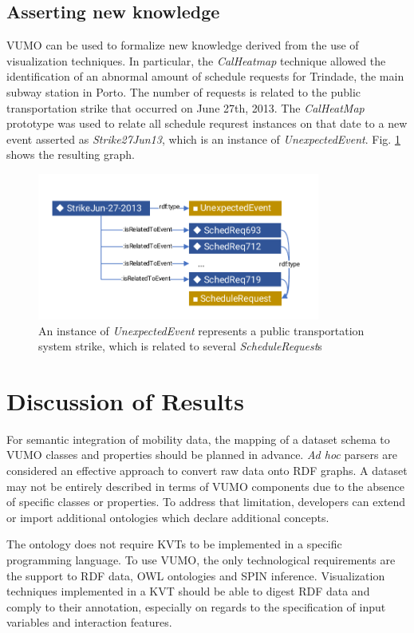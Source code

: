 \documentclass[]{interact}
\theoremstyle{plain}%
\theoremstyle{definition}
\theoremstyle{remark}
\theoremstyle{definition}
\begin{document}
\subsection{Asserting new knowledge}

VUMO can be used to formalize new knowledge derived from the use of visualization techniques. In particular, the \textit{CalHeatmap} technique allowed the identification of an abnormal amount of schedule requests for Trindade, the main subway station in Porto. The number of requests is related to the public transportation strike that occurred on June 27th, 2013. The \textit{CalHeatMap} prototype was used to relate all schedule requrest instances on that date to a new event asserted as \textit{Strike27Jun13}, which is an instance of \textit{UnexpectedEvent}. Fig. \ref{fig:strike} shows the resulting graph.

\begin{figure}[!t]
\centering
\includegraphics[width=9.3cm]{images/strike.pdf}
\caption{An instance of \textit{UnexpectedEvent} represents a public transportation system strike, which is related to several \textit{ScheduleRequest}s}
\label{fig:strike}
\end{figure}


\section{Discussion of Results}
\label{sec:discussion}

For semantic integration of mobility data, the mapping of a dataset schema to VUMO classes and properties should be planned in advance. \textit{Ad hoc} parsers are considered an effective approach to convert raw data onto RDF graphs. A dataset may not be entirely described in terms of VUMO components due to the absence of specific classes or properties. To address that limitation, developers can extend or import additional ontologies which declare additional concepts.

The ontology does not require KVTs to be implemented in a specific programming language. To use VUMO, the only technological requirements are the support to RDF data, OWL ontologies and SPIN inference. Visualization techniques implemented in a KVT should be able to digest RDF data and comply to their annotation, especially on regards to the specification of input variables and interaction features.
\end{document}
